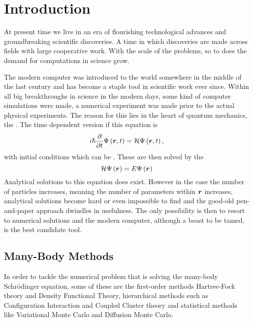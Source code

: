 \chapter{Introduction\label{chapter:1}}
    At present time we live in an era of flourishing technological advances and
    groundbreaking scientific discoveries. A time in which discoveries are made
    across fields with large cooperative work. With the scale of the problems,
    so to does the demand for computations in science grow.

    The modern computer was introduced to the world somewhere in the middle of
    the last century and has become a staple tool in scientific work ever
    since. Within all big breakthroughs in science in the modern days, some
    kind of computer simulations were made, a numerical experiment was made
    prior to the actual physical experiments. The reason for this lies in the
    heart of quantum mechanics, the . The time
    dependent version if this equation is
        \begin{equation}
            i\hbar \frac{\mathrm{\partial}}{\mathrm{\partial} t} \Psi\left(\boldsymbol{{r}},t\right) =
            \mathcal{H}\Psi\left(\boldsymbol{{r}},t\right),
        \end{equation}
    with initial conditions which can be . These are
    then solved by the 
        \begin{equation}
            \mathcal{H}\Psi\left(\boldsymbol{{r}}\right) = E\Psi\left(\boldsymbol{{r}}\right)
        \end{equation}
    Analytical solutions to this equation does exist. However in the case the
    number of particles increases, meaning the number of parameters within
    $\boldsymbol{{r}}$ increases, analytical solutions become hard or even impossible
    to find and the good-old pen-and-paper approach dwindles in usefulness.
    The only possibility is then to resort to numerical solutions and the
    modern computer, although a beast to be tamed, is the best candidate tool.

\section{Many-Body Methods}
    In order to tackle the numerical problem that is solving the many-body
    Schrödinger equation, some of these are the first-order methods
    Hartree-Fock theory and Density Functional Theory, hierarchical methods
    such as Configuration Interaction and Coupled Cluster theory and
    statistical methods like Variational Monte Carlo and Diffusion Monte Carlo. 

